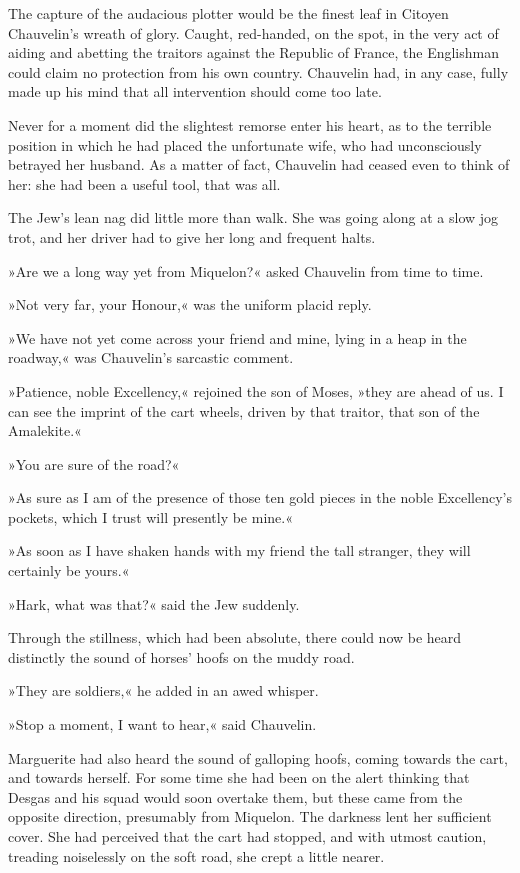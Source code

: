 The capture of the audacious plotter would be the finest leaf in Citoyen Chauvelin's wreath of glory. Caught, red-handed, on the spot, in the very act of aiding and abetting the traitors against the Republic of France, the Englishman could claim no protection from his own country. Chauvelin had, in any case, fully made up his mind that all intervention should come too late.

Never for a moment did the slightest remorse enter his heart, as to the terrible position in which he had placed the unfortunate wife, who had unconsciously betrayed her husband. As a matter of fact, Chauvelin had ceased even to think of her: she had been a useful tool, that was all.

The Jew's lean nag did little more than walk. She was going along at a slow jog trot, and her driver had to give her long and frequent halts.

»Are we a long way yet from Miquelon?« asked Chauvelin from time to time.

»Not very far, your Honour,« was the uniform placid reply.

»We have not yet come across your friend and mine, lying in a heap in the roadway,« was Chauvelin's sarcastic comment.

»Patience, noble Excellency,« rejoined the son of Moses, »they are ahead of us. I can see the imprint of the cart wheels, driven by that traitor, that son of the Amalekite.«

»You are sure of the road?«

»As sure as I am of the presence of those ten gold pieces in the noble Excellency's pockets, which I trust will presently be mine.«

»As soon as I have shaken hands with my friend the tall stranger, they will certainly be yours.«

»Hark, what was that?« said the Jew suddenly.

Through the stillness, which had been absolute, there could now be heard distinctly the sound of horses' hoofs on the muddy road.

»They are soldiers,« he added in an awed whisper.

»Stop a moment, I want to hear,« said Chauvelin.

Marguerite had also heard the sound of galloping hoofs, coming towards the cart, and towards herself. For some time she had been on the alert thinking that Desgas and his squad would soon overtake them, but these came from the opposite direction, presumably from Miquelon. The darkness lent her sufficient cover. She had perceived that the cart had stopped, and with utmost caution, treading noiselessly on the soft road, she crept a little nearer.

